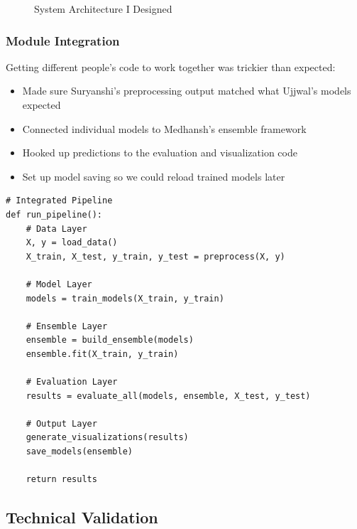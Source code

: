 \documentclass[12pt]{article}
\begin{document}
\begin{figure}[H]
{%
}
\caption{System Architecture I Designed}
\end{figure}

\subsubsection{Module Integration}
Getting different people's code to work together was trickier than expected:
\begin{itemize}
    \item Made sure Suryanshi's preprocessing output matched what Ujjwal's models expected
    \item Connected individual models to Medhansh's ensemble framework
    \item Hooked up predictions to the evaluation and visualization code
    \item Set up model saving so we could reload trained models later
\end{itemize}

\begin{lstlisting}[style=pythonstyle, caption={Main Pipeline Integration}]
# Integrated Pipeline
def run_pipeline():
    # Data Layer
    X, y = load_data()
    X_train, X_test, y_train, y_test = preprocess(X, y)
    
    # Model Layer
    models = train_models(X_train, y_train)
    
    # Ensemble Layer
    ensemble = build_ensemble(models)
    ensemble.fit(X_train, y_train)
    
    # Evaluation Layer
    results = evaluate_all(models, ensemble, X_test, y_test)
    
    # Output Layer
    generate_visualizations(results)
    save_models(ensemble)
    
    return results
\end{lstlisting}

\subsection{Technical Validation}
\end{document}
